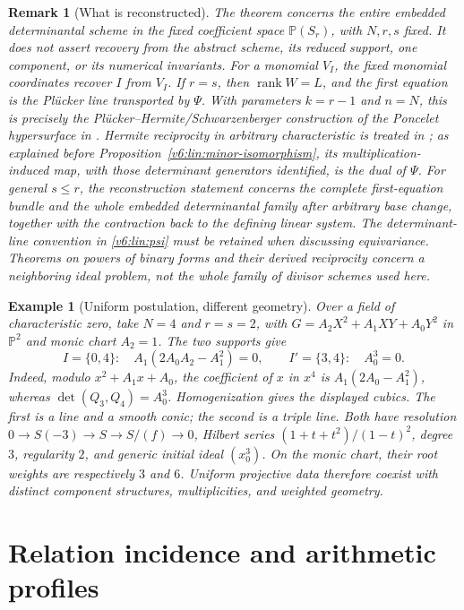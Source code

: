 \documentclass[10pt,fleqn]{article}
\numberwithin{equation}{section}
\newtheorem{remark}[theorem]{Remark}
\newtheorem{example}[theorem]{Example}
\newcommand{\PP}{\mathbb P}
\newcommand{\rank}{\operatorname{rank}}
\begin{document}
\begin{remark}[What is reconstructed]\label{v6:lin:meaning}
The theorem concerns the entire embedded determinantal scheme in the
fixed coefficient space $\PP(S_r)$, with $N,r,s$ fixed.  It does not
assert recovery from the abstract scheme, its reduced support, one
component, or its numerical invariants.  For a monomial $V_I$, the
fixed monomial coordinates recover $I$ from $V_I$.  If $r=s$, then $\rank W=L$, and the first equation is the
Pl\"ucker line transported by $\Psi$.  With parameters $k=r-1$ and
$n=N$, this is precisely the Pl\"ucker--Hermite/Schwarzenberger
construction of the Poncelet hypersurface in
\cite[Section~3.2]{IlardiSupinoValles}.  Hermite reciprocity in arbitrary
characteristic is treated in \cite{RaicuSam}; as explained before
Proposition~\ref{v6:lin:minor-isomorphism}, its multiplication-induced
map, with those determinant generators identified, is the dual of $\Psi$.
For general $s\le r$, the reconstruction statement concerns the complete
first-equation bundle and the whole embedded determinantal family after
arbitrary base change, together with the contraction back to the defining
linear system.
The determinant-line convention
in \eqref{v6:lin:psi} must be retained when discussing equivariance.
Theorems on powers of binary forms and their derived reciprocity
\cite{RaicuSamWeymanYang} concern a neighboring ideal problem, not the
whole family of divisor schemes used here.
\end{remark}

\begin{example}[Uniform postulation, different geometry]\label{ex:early-cubic}
Over a field of characteristic zero, take $N=4$ and $r=s=2$, with
$G=A_2X^2+A_1XY+A_0Y^2$ in $\PP^2$ and monic chart $A_2=1$.
The two supports give
\[
 I=\{0,4\}:\quad A_1(2A_0A_2-A_1^2)=0,
 \qquad I'=\{3,4\}:\quad A_0^3=0.
\]
Indeed, modulo $x^2+A_1x+A_0$, the coefficient of $x$ in $x^4$ is
$A_1(2A_0-A_1^2)$, whereas $\det(Q_3,Q_4)=A_0^3$.
Homogenization gives the displayed cubics. The first is a line and a smooth
conic; the second is a triple line. Both have resolution $0\to S(-3)\to S\to S/(f)\to0$,
Hilbert series $(1+t+t^2)/(1-t)^2$, degree $3$, regularity $2$,
and generic initial ideal $(x_0^3)$. On the monic chart, their root weights are respectively
$3$ and $6$. Uniform projective data therefore coexist with distinct
component structures, multiplicities, and weighted geometry.
\end{example}


\section{Relation incidence and arithmetic profiles}\label{sec:projective-incidence}
\label{sec:monodromy}
\end{document}
